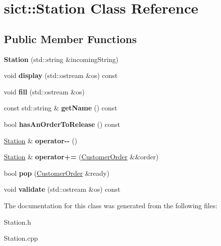 \hypertarget{classsict_1_1Station}{}\section{sict\+::Station Class Reference}
\label{classsict_1_1Station}
\subsection*{Public Member Functions}
\begin{DoxyCompactItemize}
\item 
\mbox{\label{classsict_1_1Station_a95b3910ac2cf806fed948b473c870e64}} 
{\bfseries Station} (std\+::string \&incoming\+String)
\item 
\mbox{\label{classsict_1_1Station_a83b3f64c0c2063a730a14888869b022d}} 
void {\bfseries display} (std\+::ostream \&os) const
\item 
\mbox{\label{classsict_1_1Station_ad81558c1e92485344e5d0b1b773b0fae}} 
void {\bfseries fill} (std\+::ostream \&os)
\item 
\mbox{\label{classsict_1_1Station_aa35cfe52f0f33ef1399f6b4b6f5ed91f}} 
const std\+::string \& {\bfseries get\+Name} () const
\item 
\mbox{\label{classsict_1_1Station_a9e892b3c93dd2163d1c6569dba6c8536}} 
bool {\bfseries has\+An\+Order\+To\+Release} () const
\item 
\mbox{\label{classsict_1_1Station_ab5c0ac9d9ccdd92469542a49e3c01e05}} 
\mbox{\hyperlink{classsict_1_1Station}{Station}} \& {\bfseries operator-\/-\/} ()
\item 
\mbox{\label{classsict_1_1Station_acd6e5d1500de14a981885e060b31d5ca}} 
\mbox{\hyperlink{classsict_1_1Station}{Station}} \& {\bfseries operator+=} (\mbox{\hyperlink{classsict_1_1CustomerOrder}{Customer\+Order}} \&\&order)
\item 
\mbox{\label{classsict_1_1Station_a583745c920a8fd95aaaf84ef2d96a993}} 
bool {\bfseries pop} (\mbox{\hyperlink{classsict_1_1CustomerOrder}{Customer\+Order}} \&ready)
\item 
\mbox{\label{classsict_1_1Station_a93da83c7e33b4b336225cc4753ee91da}} 
void {\bfseries validate} (std\+::ostream \&os) const
\end{DoxyCompactItemize}


The documentation for this class was generated from the following files\+:\begin{DoxyCompactItemize}
\item 
Station.\+h\item 
Station.\+cpp\end{DoxyCompactItemize}
